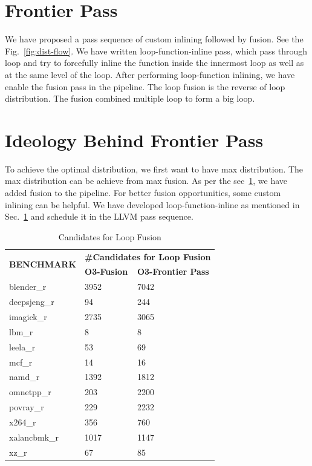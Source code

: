 \section{Frontier Pass}\label{sec:distribution:fp}
 We have proposed a pass sequence of custom inlining followed by fusion. See the Fig.~\ref{fig:dist-flow}. We have written loop-function-inline pass, which pass through loop and try to forcefully inline the function inside the innermost loop as well as at the same level of the loop. After performing loop-function inlining, we have enable the fusion pass in the pipeline. The loop fusion is the reverse of loop distribution. The fusion combined multiple loop to form a big loop. 
 


\section{Ideology Behind Frontier Pass}
To achieve the optimal distribution, we first want to have max distribution. The max distribution can be achieve from max fusion. As per the sec~\ref{sec:distribution:fp}, we have added fusion to the pipeline. For better fusion opportunities, some custom inlining can be helpful. We have developed loop-function-inline as mentioned in Sec.~\ref{sec:distribution:fp} and schedule it in the LLVM pass sequence. 

\begin{table}[h]
\begin{tabular}{|l|l|l|}
\hline
\multirow{2}{*}{\textbf{BENCHMARK}} & \multicolumn{2}{c|}{\textbf{\#Candidates for Loop Fusion}} \\ \cline{2-3} 
 & \textbf{O3-Fusion} & \textbf{O3-Frontier Pass} \\ \hline
blender\_r & 3952 & 7042 \\ \hline
deepsjeng\_r & 94 & 244 \\ \hline
imagick\_r & 2735 & 3065 \\ \hline
lbm\_r & 8 & 8 \\ \hline
leela\_r & 53 & 69 \\ \hline
mcf\_r & 14 & 16 \\ \hline
namd\_r & 1392 & 1812 \\ \hline
omnetpp\_r & 203 & 2200 \\ \hline
povray\_r & 229 & 2232 \\ \hline
x264\_r & 356 & 760 \\ \hline
xalancbmk\_r & 1017 & 1147 \\ \hline
xz\_r & 67 & 85 \\ \hline
\end{tabular}
\centering
\caption{Candidates for Loop Fusion}
\label{tab:dist:fuscand}
\end{table}

